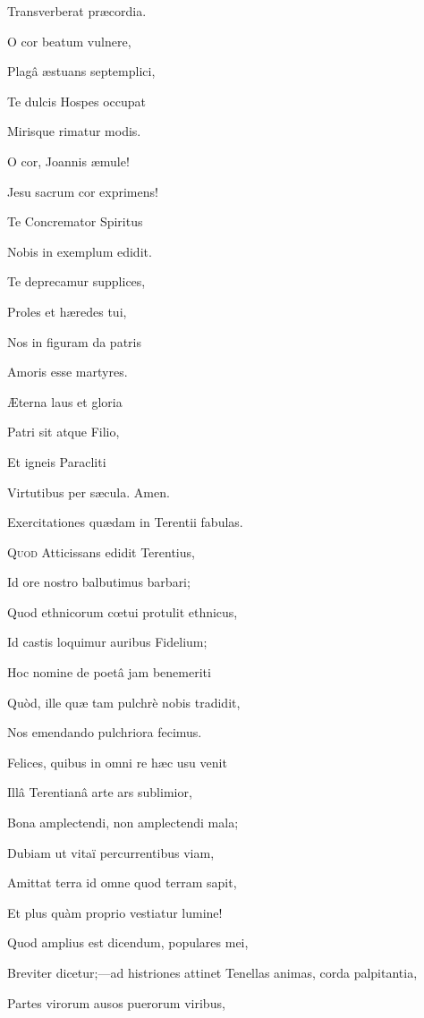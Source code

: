 Transverberat præcordia.

O cor beatum vulnere,

Plagâ æstuans septemplici,

Te dulcis Hospes occupat

Mirisque rimatur modis. 

O cor, Joannis æmule!

Jesu sacrum cor exprimens!

Te Concremator Spiritus

Nobis in exemplum edidit.

Te deprecamur supplices,

Proles et hæredes tui,

Nos in figuram da patris

Amoris esse martyres.

Æterna laus et gloria

Patri sit atque Filio,

Et igneis Paracliti

Virtutibus per sæcula. Amen.


Exercitationes quædam in Terentii fabulas.


Q\textsc{uod} Atticissans edidit Terentius,

Id ore nostro balbutimus barbari;

Quod ethnicorum cœtui protulit ethnicus,

Id castis loquimur auribus Fidelium;

Hoc nomine de poetâ jam benemeriti

Quòd, ille quæ tam pulchrè nobis tradidit,

Nos emendando pulchriora fecimus.

Felices, quibus in omni re hæc usu venit

Illâ Terentianâ arte ars sublimior,

Bona amplectendi, non amplectendi mala;

Dubiam ut vitaï percurrentibus viam,

Amittat terra id omne quod terram sapit,

Et plus quàm proprio vestiatur lumine!

Quod amplius est dicendum, populares mei,

Breviter dicetur;—ad histriones attinet Tenellas animas, corda palpitantia,

Partes virorum ausos puerorum viribus,

